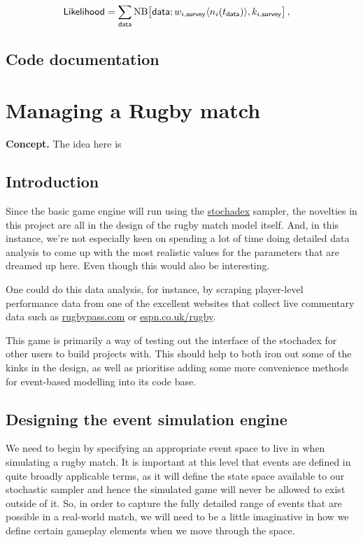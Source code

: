 \documentclass{book}
\begin{document}
\begin{align}
{\sf Likelihood} &= \sum_{{\sf data}}{\rm NB}\big[{\sf data};w_{i,{\sf survey}}\langle n_i(t_{{\sf data}})\rangle,k_{i,{\sf survey}}\big] \,,
\end{align}


\section{\sffamily Code documentation}


\chapter{\sffamily Managing a Rugby match}

{\bfseries\sffamily Concept.} The idea here is 

\section{\sffamily Introduction}

Since the basic game engine will run using the \href{https://github.com/umbralcalc/stochadex}{stochadex} sampler, the novelties in this project are all in the design of the rugby match model itself. And, in this instance, we're not especially keen on spending a lot of time doing detailed data analysis to come up with the most realistic values for the parameters that are dreamed up here. Even though this would also be interesting.

One could do this data analysis, for instance, by scraping player-level performance data from one of the excellent websites that collect live commentary data such as \href{https://www.rugbypass.com/}{rugbypass.com} or \href{https://www.espn.co.uk/rugby/}{espn.co.uk/rugby}.

This game is primarily a way of testing out the interface of the stochadex for other users to build projects with. This should help to both iron out some of the kinks in the design, as well as prioritise adding some more convenience methods for event-based modelling into its code base.

\section{\sffamily Designing the event simulation engine}

We need to begin by specifying an appropriate event space to live in when simulating a rugby match. It is important at this level that events are defined in quite broadly applicable terms, as it will define the state space available to our stochastic sampler and hence the simulated game will never be allowed to exist outside of it. So, in order to capture the fully detailed range of events that are possible in a real-world match, we will need to be a little imaginative in how we define certain gameplay elements when we move through the space.
\end{document}
